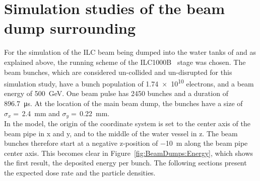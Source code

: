 \section{Simulation studies of the beam dump surrounding}
\label{BeamDumps:sim_surrounding}
For the \fluka simulation of the ILC beam being dumped into the water tanks of \designone and \designtwo as explained above, the running scheme of the ILC1000B~\cite[p. 11]{TDR1} stage was chosen.
The beam bunches, which are considered un-collided and un-disrupted for this simulation study, have a bunch population of \num{1.74e10} electrons, and a beam energy of \SI{500}{\GeV}.
One beam pulse has \num{2450} bunches and a duration of \SI{896.7}{\micro\second}.
At the location of the main beam dump, the bunches have a size of $\sigma_x = $\,\SI{2.4}{\milli\meter} and $\sigma_y = $\,\SI{0.22}{\milli\meter}.
\\In the \fluka model, the origin of the coordinate system is set to the center axis of the beam pipe in x and y, and to the middle of the water vessel in z.
The beam bunches therefore start at a negative z-position of \SI{-10}{\meter} along the beam pipe center axis.
This becomes clear in Figure~\ref{fig:BeamDumps:Energy}, which shows the first \fluka result, the deposited energy per bunch.
The following sections present the expected dose rate and the particle densities.

